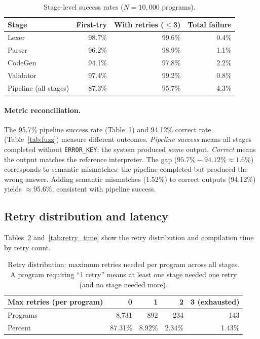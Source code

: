 \documentclass[11pt]{article}
\begin{document}
\begin{table}[h]
\centering
\caption{Stage-level success rates ($N=10{,}000$ programs).}
\label{tab:stage_success}
\begin{tabular}{lrrr}
\toprule
Stage & First-try & With retries ($\leq$3) & Total failure \\
\midrule
Lexer & 98.7\% & 99.6\% & 0.4\% \\
Parser & 96.2\% & 98.9\% & 1.1\% \\
CodeGen & 94.1\% & 97.8\% & 2.2\% \\
Validator & 97.4\% & 99.2\% & 0.8\% \\
\midrule
Pipeline (all stages) & 87.3\% & 95.7\% & 4.3\% \\
\bottomrule
\end{tabular}

\paragraph{Metric reconciliation.}
The 95.7\% pipeline success rate (Table~\ref{tab:stage_success}) and 94.12\% correct rate (Table~\ref{tab:fuzz}) measure different outcomes.
\emph{Pipeline success} means all stages completed without \texttt{ERROR\_KEY}; the system produced \emph{some} output.
\emph{Correct} means the output matches the reference interpreter.
The gap ($95.7\% - 94.12\% \approx 1.6\%$) corresponds to semantic mismatches: the pipeline completed but produced the wrong answer.
Adding semantic mismatches (1.52\%) to correct outputs (94.12\%) yields $\approx$95.6\%, consistent with pipeline success.
\end{table}

\subsection{Retry distribution and latency}
Tables~\ref{tab:retry_dist} and~\ref{tab:retry_time} show the retry distribution and compilation time by retry count.
\begin{table}[h]
\centering
\caption{Retry distribution: maximum retries needed per program across all stages. A program requiring ``1 retry'' means at least one stage needed one retry (and no stage needed more).}
\label{tab:retry_dist}
\begin{tabular}{lrrrr}
\toprule
Max retries (per program) & 0 & 1 & 2 & 3 (exhausted) \\
\midrule
Programs & 8{,}731 & 892 & 234 & 143 \\
Percent & 87.31\% & 8.92\% & 2.34\% & 1.43\% \\
\bottomrule
\end{tabular}
\end{table}
\end{document}
